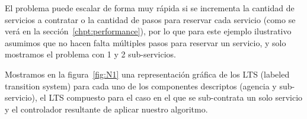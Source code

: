 El problema puede escalar de forma muy rápida si se incrementa la cantidad de servicios a contratar o la cantidad de pasos para reservar cada servicio (como se verá en la sección~\ref{chpt:performance}), por lo que para este ejemplo ilustrativo asumimos que no hacen falta múltiples pasos para reservar un servicio, y solo mostramos el problema con 1 y 2 sub-servicios.

Mostramos en la figura~\ref{fig:N1} una representación gráfica de los LTS (labeled transition system) para cada uno de los componentes descriptos (agencia y sub-servicio), el LTS compuesto para el caso en el que se sub-contrata un solo servicio y el controlador resultante de aplicar nuestro algoritmo. 

\begin{figure}[htb]
	\begin{center}
\end{center}
\end{figure}
